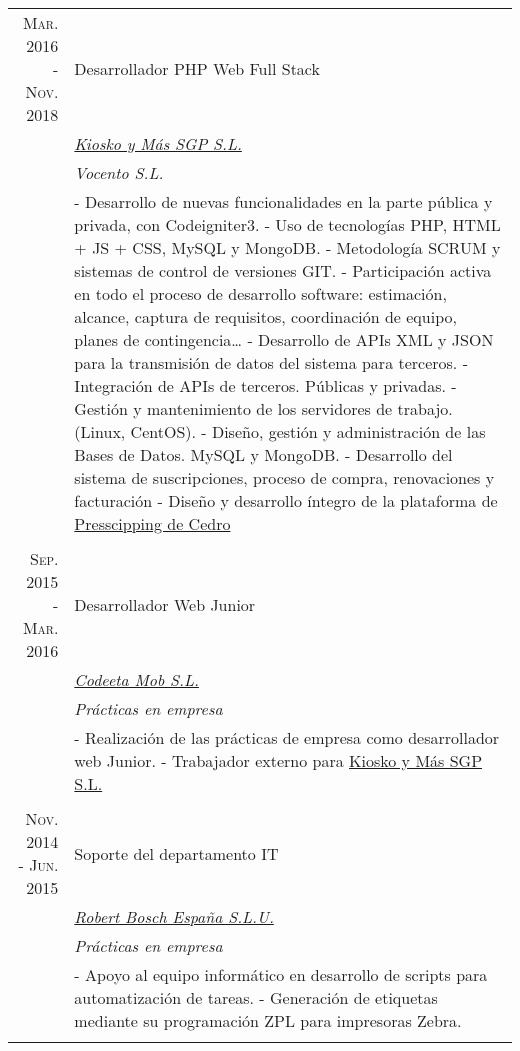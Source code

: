 \documentclass[a4paper,10pt]{article}
\begin{document}
\begin{tabular}{r|p{11cm}}
 	\textsc{Mar. 2016 - Nov. 2018} & 	Desarrollador PHP Web Full Stack \\&
	\emph{\href{https://www.kioskoymas.com}{Kiosko y Más SGP S.L.}}\\&
	\emph{Vocento S.L.}\\&
	\footnotesize{
		- Desarrollo de nuevas funcionalidades en la parte pública y privada, con Codeigniter3.\newline
		- Uso de tecnologías PHP, HTML + JS + CSS, MySQL y MongoDB. \newline
		- Metodología SCRUM y sistemas de control de versiones GIT.\newline
		- Participación activa en todo el proceso de desarrollo software: estimación, alcance, captura de requisitos, coordinación de equipo, planes de contingencia… \newline
		- Desarrollo de APIs XML y JSON para la transmisión de datos del sistema para terceros. \newline
		- Integración de APIs de terceros. Públicas y privadas.\newline
		- Gestión y mantenimiento de los servidores de trabajo. (Linux, CentOS).\newline
		- Diseño, gestión y administración de las Bases de Datos. MySQL y MongoDB.\newline
		- Desarrollo del sistema de suscripciones, proceso de compra, renovaciones y facturación\newline
		- Diseño y desarrollo íntegro de la plataforma de \href{http://pressclipping.cedro.org}{Presscipping de Cedro}	
	}
	\\\multicolumn{2}{c}{} \\

 	\textsc{Sep. 2015 - Mar. 2016} & 	Desarrollador Web Junior \\&
	\emph{\href{https://codeeta.com/}{Codeeta Mob S.L.}}\\&
	\emph{Prácticas en empresa}\\&
	\footnotesize{
		- Realización de las prácticas de empresa como desarrollador web Junior.\newline
		- Trabajador externo para \href{https://www.kioskoymas.com}{Kiosko y Más SGP S.L.}
	}
	\\\multicolumn{2}{c}{} \\

 	\textsc{Nov. 2014 - Jun. 2015} & 	Soporte del departamento IT \\&
	\emph{\href{https://www.grupo-bosch.es/}{Robert Bosch España S.L.U.}}\\&
	\emph{Prácticas en empresa}\\&
	\footnotesize{
		- Apoyo al equipo informático en desarrollo de scripts para automatización de tareas.	\newline
		- Generación de etiquetas mediante su programación ZPL para impresoras Zebra.
	}
	\\\multicolumn{2}{c}{} \\


\end{tabular}
\end{document}
